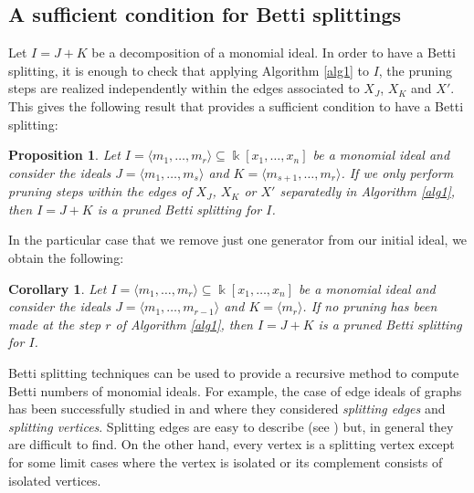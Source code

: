 \documentclass[12pt]{amsart}
\newtheorem{corollary}[theorem]{Corollary}
\newtheorem{proposition}[theorem]{Proposition}
\theoremstyle{definition}
\theoremstyle{remark}
\numberwithin{equation}{section}
\newcommand\kk{\Bbbk}
\begin{document}
\subsection{A sufficient condition for Betti splittings}



Let $I=J+K$ be a decomposition of a monomial ideal.
In order to have a Betti splitting, it is enough to check that applying Algorithm \ref{alg1} to $I$,
the pruning steps are realized
independently within the edges associated to $X_J$, $X_K$ and $X'$.
This gives the following result that provides a sufficient condition to have a Betti splitting:

\begin{proposition}
Let $I=\langle m_1,\dots,m_r \rangle\subseteq \kk[x_1,\dots,x_n]$ be a monomial
ideal and consider the ideals $J=\langle m_1,\dots,m_s \rangle$ and $K=
\langle m_{s+1},\dots,m_r \rangle$.  If  we only perform pruning steps within the
edges of $X_J$, $X_K$ or $X'$ separatedly in Algorithm
\ref{alg1}, then $I=J+K$ is a pruned Betti splitting for $I$.
\end{proposition}

In the particular case that we remove just one generator from our initial ideal,
we obtain the following:

\begin{corollary}
Let $I=\langle m_1,\dots,m_r \rangle\subseteq \kk[x_1,\dots,x_n]$ be
a monomial ideal and consider the ideals $J=\langle
m_1,\dots,m_{r-1} \rangle$ and $K= \langle m_r \rangle$. If no
pruning has been made at the step $r$ of Algorithm \ref{alg1}, then
$I=J+K$ is a pruned Betti splitting for $I$.
\end{corollary}

\vskip 2mm

 Betti splitting techniques can be used to provide a recursive
 method to compute Betti numbers of monomial ideals. For example,
 the case of edge ideals of graphs has been successfully studied in \cite{HVT1} and \cite{FHV}
where they considered {\it splitting edges} and {\it
splitting vertices}. Splitting edges are easy to describe (see
\cite[Theorem 3.4]{FHV}) but, in general they are difficult to find.
On the other hand, every vertex is a splitting vertex except for some limit cases where the vertex is
isolated or its complement consists of isolated vertices.
\end{document}
